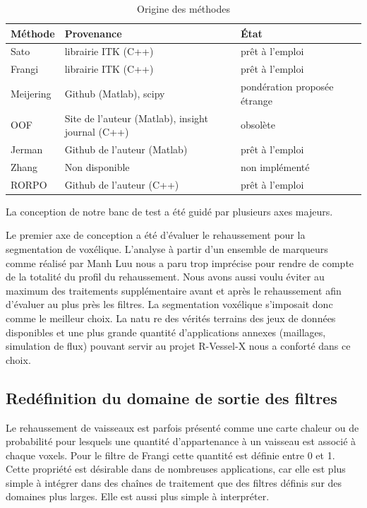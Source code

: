   \begin{table}
    \begin{center}
        \begin{tabular}{l|l|l|l}
            Méthode   &  Provenance                                     & État \\ \hline  \hline 
            Sato      & librairie ITK (C++)                             & prêt à l'emploi \\ \hline
            Frangi    & librairie ITK (C++)                             & prêt à l'emploi \\ \hline
            Meijering & Github (Matlab), scipy                          & pondération proposée étrange  \\ \hline
            OOF       & Site de l'auteur (Matlab), insight journal (C++)& obsolète \\ \hline
            Jerman    & Github de l'auteur (Matlab)                     & prêt à l'emploi \\ \hline
            Zhang     & Non disponible                                  & non implémenté \\ \hline
            RORPO     & Github de l'auteur (C++)                        & prêt à l'emploi  
        \end{tabular}
    \end{center}
    \caption{Origine des méthodes}
    \label{Tab:origins_vesselness}
  \end{table}

La conception de notre banc de test a été guidé par plusieurs axes majeurs.
  
Le premier axe de conception a été d'évaluer le rehaussement pour la segmentation de voxélique. L'analyse à partir d'un ensemble de marqueurs comme réalisé par Manh Luu nous a paru trop imprécise pour rendre de compte de la totalité du profil du rehaussement. Nous avons aussi voulu éviter au maximum des traitements supplémentaire avant et après le rehaussement afin d'évaluer au plus près les filtres. La segmentation voxélique s'imposait donc comme le meilleur choix. La natu
re des vérités terrains des jeux de données disponibles et une plus grande quantité d'applications annexes (maillages, simulation de flux) pouvant servir au projet R-Vessel-X  nous a conforté dans ce choix.

\subsection{Redéfinition du domaine de sortie des filtres}
Le rehaussement de vaisseaux est parfois présenté comme une carte chaleur ou de probabilité pour lesquels une quantité d'appartenance à un vaisseau est associé à chaque voxels. Pour le filtre de Frangi cette quantité est définie entre 0 et 1. Cette propriété est désirable dans de nombreuses applications, car elle est plus simple à intégrer dans des chaînes de traitement que des filtres définis sur des domaines plus larges. Elle est aussi plus simple à interpréter.

